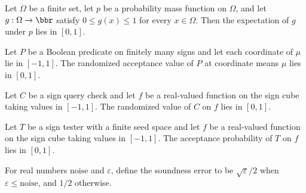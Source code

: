 \begin{theorem}
\label{FABL.pmfExpectation_mem_Icc_zero_one}
\leanok
{}
Let $\Omega$ be a finite set, let $p$ be a probability mass function on $\Omega$, and
let $g:\Omega\to\bbr$ satisfy $0\le g(x)\le 1$ for every $x\in\Omega$. Then the
expectation of $g$ under $p$ lies in $[0,1]$.
\end{theorem}

\begin{theorem}
\label{FABL.SignPredicate.randomizedValue_mem_Icc}
\leanok
{}
Let $P$ be a Boolean predicate on finitely many signs and let each coordinate of $\mu$
lie in $[-1,1]$. The randomized acceptance value of $P$ at coordinate means $\mu$ lies
in $[0,1]$.
\end{theorem}

\begin{theorem}
\label{FABL.SignQueryCheck.randomizedValue_mem_Icc}
\leanok
{}
Let $C$ be a sign query check and let $f$ be a real-valued function on the sign cube
taking values in $[-1,1]$. The randomized value of $C$ on $f$ lies in $[0,1]$.
\end{theorem}

\begin{theorem}
\label{FABL.SignTester.acceptanceProbability_mem_Icc}
\leanok
{}
Let $T$ be a sign tester with a finite seed space and let $f$ be a real-valued function
on the sign cube taking values in $[-1,1]$. The acceptance probability of $T$ on $f$
lies in $[0,1]$.
\end{theorem}

\begin{definition}
\label{FABL.hastadSoundnessError}
\leanok
For real numbers $\mathrm{noise}$ and $\varepsilon$, define the soundness error to be
$\sqrt{\varepsilon}/2$ when $\varepsilon\leq\mathrm{noise}$, and $1/2$ otherwise.
\end{definition}

